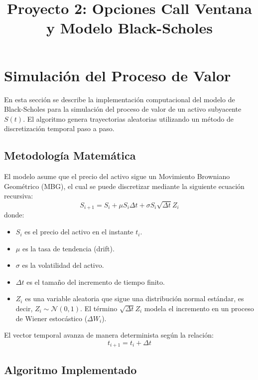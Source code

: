 \documentclass[12pt, a4paper]{article}
\title{Proyecto 2: Opciones Call Ventana y Modelo Black-Scholes}
\author{}
\date{}
\begin{document}
\maketitle

\section{Simulación del Proceso de Valor}

En esta sección se describe la implementación computacional del modelo de Black-Scholes para la simulación del proceso de valor de un activo subyacente $S(t)$. El algoritmo genera trayectorias aleatorias utilizando un método de discretización temporal paso a paso.

\subsection{Metodología Matemática}

El modelo asume que el precio del activo sigue un Movimiento Browniano Geométrico (MBG), el cual se puede discretizar mediante la siguiente ecuación recursiva:
\begin{equation}
    S_{i+1} = S_i + \mu S_i \Delta t + \sigma S_i \sqrt{\Delta t} Z_i
\end{equation}
donde:
\begin{itemize}
    \item $S_i$ es el precio del activo en el instante $t_i$.
    \item $\mu$ es la tasa de tendencia (drift).
    \item $\sigma$ es la volatilidad del activo.
    \item $\Delta t$ es el tamaño del incremento de tiempo finito.
    \item $Z_i$ es una variable aleatoria que sigue una distribución normal estándar, es decir, $Z_i \sim \mathcal{N}(0,1)$. El término $\sqrt{\Delta t} Z_i$ modela el incremento en un proceso de Wiener estocástico ($\Delta W_i$).
\end{itemize}

El vector temporal avanza de manera determinista según la relación:
\begin{equation}
    t_{i+1} = t_i + \Delta t
\end{equation}

\subsection{Algoritmo Implementado}
\end{document}
